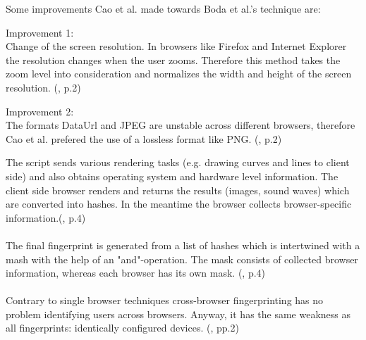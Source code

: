 Some improvements Cao et al. made towards Boda et al.'s technique are:
\begin{tcolorbox}
	Improvement 1:\\
	Change of the screen resolution. In browsers like Firefox and Internet Explorer the resolution changes when the user zooms. Therefore this method takes the zoom level into consideration and normalizes the width and height of the screen resolution. (\textcite{Cao17}, p.2)
\end{tcolorbox}
\begin{tcolorbox}
	Improvement 2:\\
	The formats DataUrl and JPEG are unstable across different browsers, therefore Cao et al. prefered the use of a lossless format like PNG. (\textcite{Cao17}, p.2)
\end{tcolorbox}
The script sends various rendering tasks (e.g. drawing curves and lines to client side) and also obtains operating system and hardware level information. The client side browser renders and returns the results (images, sound waves) which are converted into hashes. In the meantime the browser collects browser-specific information.(\textcite{Cao17}, p.4)\\\\
The final fingerprint is generated from a list of hashes which is intertwined with a mash with the help of an "and"-operation. The mask consists of collected browser information, whereas each browser has its own mask. (\textcite{Cao17}, p.4)\\\\
Contrary to single browser techniques cross-browser fingerprinting has no problem identifying users across browsers. Anyway, it has the same weakness as all fingerprints: identically configured devices. (\textcite{upi15}, pp.2)

